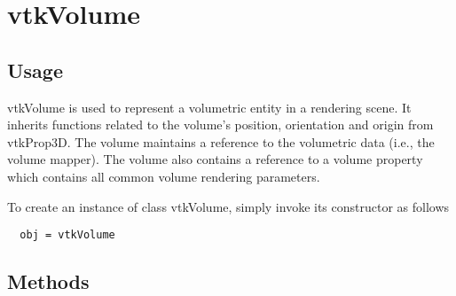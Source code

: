 \section{vtkVolume}

\subsection{Usage}

 vtkVolume is used to represent a volumetric entity in a rendering scene.
 It inherits functions related to the volume's position, orientation and
 origin from vtkProp3D. The volume maintains a reference to the
 volumetric data (i.e., the volume mapper). The volume also contains a
 reference to a volume property which contains all common volume rendering 
 parameters.

To create an instance of class vtkVolume, simply
invoke its constructor as follows
\begin{verbatim}
  obj = vtkVolume
\end{verbatim}
\subsection{Methods}

